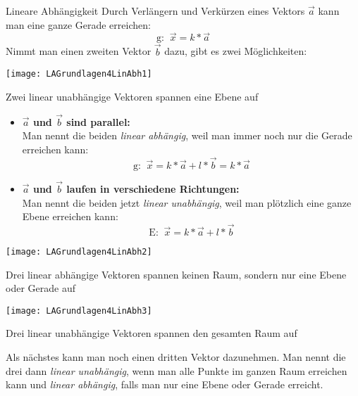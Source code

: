 \clearpage

\begin{bla}{Lineare Abhängigkeit}
  Durch Verlängern und Verkürzen eines Vektors $\vec{a}$ kann man eine ganze Gerade erreichen:
  \[
  \text{g: }\ \vec{x} = k * \vec{a}
  \]
  Nimmt man einen zweiten Vektor $\vec{b}$ dazu, gibt es zwei Möglichkeiten:
  \begin{marginfigure}[0em]
    \texttt{[image: LAGrundlagen4LinAbh1]}
    \caption{Zwei linear unabhängige Vektoren spannen eine Ebene auf}
  \end{marginfigure}
  \begin{itemize}
    \item \textbf{$\vec{a}$ und $\vec{b}$ sind parallel:} \\
    Man nennt die beiden \emph{linear abhängig}, weil man immer noch nur die Gerade erreichen kann:
    \[
    \text{g: }\ \vec{x} = k * \vec{a} +  l * \vec{b} =  k * \vec{a}
    \]
    \item \textbf{$\vec{a}$ und $\vec{b}$ laufen in verschiedene Richtungen:} \\
    Man nennt die beiden jetzt \emph{linear unabhängig}, weil man plötzlich eine ganze Ebene erreichen kann:
    \[
    \text{E: }\ \vec{x} = k * \vec{a} +  l * \vec{b}
    \]
  \end{itemize}

  \begin{marginfigure}[-10em]
    \texttt{[image: LAGrundlagen4LinAbh2]}
    \caption{Drei linear abhängige Vektoren spannen keinen Raum, sondern nur eine Ebene oder Gerade auf}
  \end{marginfigure}
  \begin{marginfigure}
    \texttt{[image: LAGrundlagen4LinAbh3]}
    \caption{Drei linear unabhängige Vektoren spannen den gesamten Raum auf}
  \end{marginfigure}
  Als nächstes kann man noch einen dritten Vektor dazunehmen.
  Man nennt die drei dann \emph{linear unabhängig}, wenn man alle Punkte im ganzen Raum erreichen kann und \emph{linear abhängig}, falls man nur eine Ebene oder Gerade erreicht.
\end{bla}
